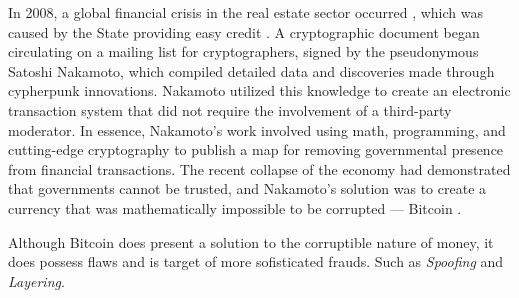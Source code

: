 In 2008, a global financial crisis in the real estate sector occurred \cite{bordo2008historical}, which was caused by
the State providing easy credit \cite{murphy2008analysis}. A cryptographic document began circulating on a mailing list
for cryptographers, signed by the pseudonymous Satoshi Nakamoto, which compiled detailed data and discoveries made
through cypherpunk innovations. Nakamoto utilized this knowledge to create an electronic transaction system that did not
require the involvement of a third-party moderator. In essence, Nakamoto's work involved using math, programming, and
cutting-edge cryptography to publish a map for removing governmental presence from financial transactions. The recent
collapse of the economy had demonstrated that governments cannot be trusted, and Nakamoto's solution was to create a
currency that was mathematically impossible to be corrupted --- Bitcoin \cite{nakamoto2008bitcoin}.

Although Bitcoin does present a solution to the corruptible nature of money, it does possess flaws and is target of more
sofisticated frauds. Such as \textit{Spoofing} and \textit{Layering}.